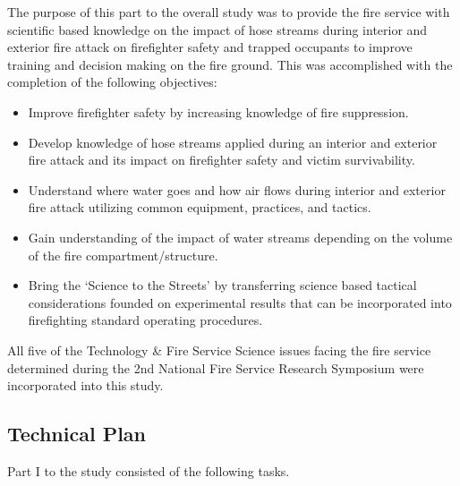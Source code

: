 \documentclass{article}
\begin{document}
The purpose of this part to the overall study was to provide the fire service with scientific based knowledge on the impact of hose streams during interior and exterior fire attack on firefighter safety and trapped occupants to improve training and decision making on the fire ground. This was accomplished with the completion of the following objectives:

\begin{itemize}
	\item Improve firefighter safety by increasing knowledge of fire suppression.
	\item Develop knowledge of hose streams applied during an interior and exterior fire attack and its impact on firefighter safety and victim survivability.
	\item Understand where water goes and how air flows during interior and exterior fire attack utilizing common equipment, practices, and tactics.
	\item Gain understanding of the impact of water streams depending on the volume of the fire compartment/structure.
	\item Bring the `Science to the Streets' by transferring science based tactical considerations founded on experimental results that can be incorporated into firefighting standard operating procedures.
	\end{itemize}

All five of the Technology \& Fire Service Science issues facing the fire service determined during the 2nd National Fire Service Research Symposium \cite{NFFF} were incorporated into this study.

\clearpage

\subsection{Technical Plan}

Part I to the study consisted of the following tasks. 
\end{document}
